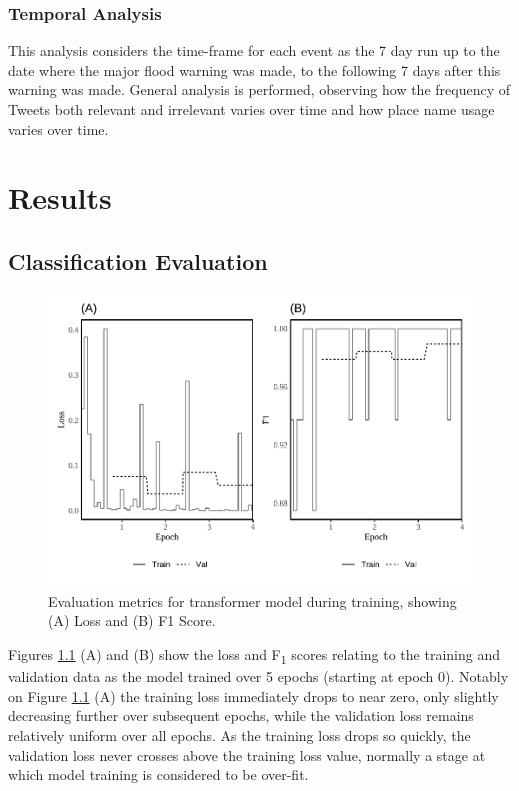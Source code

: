 \documentclass[a4paper, notitlepage]{extreport}
\begin{document}
\hypertarget{temporal-analysis}{%
\subsection{Temporal Analysis}\label{temporal-analysis}}

This analysis considers the time-frame for each event as the 7 day run
up to the date where the major flood warning was made, to the following
7 days after this warning was made. General analysis is performed,
observing how the frequency of Tweets both relevant and irrelevant
varies over time and how place name usage varies over time.

\chapter{Results}

\hypertarget{classification-evaluation}{%
\section{Classification Evaluation}\label{classification-evaluation}}

\begin{figure}[tb]

{\centering \includegraphics[width=.75\linewidth]{index_files/figure-latex/lossgraph-1} 

}

\caption{Evaluation metrics for transformer model during training, showing (A) Loss and (B) F1 Score.}\label{fig:lossgraph}
\end{figure}

Figures \ref{fig:lossgraph} (A) and (B) show the loss and
F\textsubscript{1} scores relating to the training and validation data
as the model trained over 5 epochs (starting at epoch 0). Notably on
Figure \ref{fig:lossgraph} (A) the training loss immediately drops to
near zero, only slightly decreasing further over subsequent epochs,
while the validation loss remains relatively uniform over all epochs. As
the training loss drops so quickly, the validation loss never crosses
above the training loss value, normally a stage at which model training
is considered to be over-fit.
\end{document}
